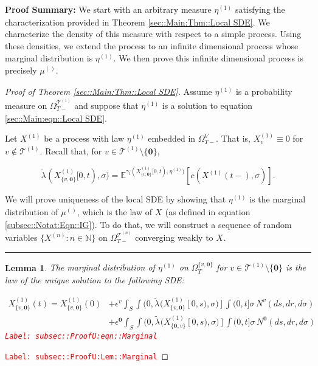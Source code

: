 \documentclass[12pt]{article}
\newcommand{\mb}{\mathbb}
\newcommand{\mc}{\mathcal}
\newcommand{\ov}{\overline}
\newcommand{\ep}{\epsilon}
\newcommand{\tr}{\textcolor{red}}
\newcommand{\labe}[1]{\tr{\texttt{Label: #1}}}
\newcommand{\pfsum}{\textbf{Proof Summary: }}
\newcommand{\ind}{\hspace{24pt}}
\newcommand{\lin}{\rule{\linewidth}{0.4 pt}}
\newcommand{\exmu}[2]{\mb{E}^{#1}\left[#2\right]}	%
\renewcommand{\root}{\mathbf{0}}				%
\renewcommand{\v}{v}							%
\renewcommand{\S}{S}							%
\newcommand{\s}{\sigma}							%
\newcommand{\ev}{\ep}							%
\newcommand{\T}{T}								%
\renewcommand{\t}{t}							%
\newcommand{\sset}{\Omega}						%
\renewcommand{\tt}{s}							%
\newcommand{\X}{X}								%
\newcommand{\vind}[1]{^{#1}}					%
\newcommand{\vsi}[1]{^{#1}}						%
\newcommand{\cind}[1]{_{#1}}					%
\newcommand{\tp}[1]{(#1)}						%
\newcommand{\tip}[1]{#1}						%
\newcommand{\ts}[1]{_{#1}}						%
\newcommand{\IGrg}{\ov{c}}						%
\newcommand{\tree}{\mc{T}}						%
\newcommand{\sln}[1]{^{(#1)}}					%
\newcommand{\poiss}{N}							%
\renewcommand{\r}{r}							%
\newcommand{\alt}[1]{\widetilde{#1}}			%
\newcommand{\m}{\mu}							%
\newcommand{\mmm}{\eta}							%
\newcommand{\cm}{\gamma}						%
\newcommand{\crate}{\alt{\lambda}}				%
\newtheorem{lem}[thms]{Lemma}
\begin{document}
\pfsum We start with an arbitrary measure \(\mmm\sln{1}\ts{}\) satisfying the characterization provided in Theorem \ref{sec::Main:Thm::Local SDE}. We characterize the density of this measure with respect to a simple process. Using these densities, we extend the process to an infinite dimensional process whose marginal distribution is \(\mmm\sln{1}\ts{}\). We then prove this infinite dimensional process is precisely \(\m\sln{}\ts{}\).

\begin{proof}[Proof of Theorem \ref{sec::Main:Thm::Local SDE}]

Assume \(\mmm\sln{1}\ts{}\) is a probability measure on \(\sset\vsi{\tree\sln{1}}\ts{\T-}\) and suppose that \(\mmm\sln{1}\ts{}\) is a solution to equation \eqref{sec::Main:eqn::Local SDE}.

\ind Let \(\X\sln{1}\cind{}\tip{}\) be a process with law \(\mmm\sln{1}\ts{}\) embedded in \(\sset\vsi{V}\ts{\T-}\). That is, \(\X\sln{1}\cind{\v}\tip{} \equiv 0\) for \(\v \notin \tree\sln{1}\). Recall that, for \(\v \in \tree\sln{1}\setminus\{\root\}\),

\[\crate\vind{}\ts{}(\X\sln{1}\cind{\{\v,\root\}}\tip{[0,\t)},\s) = \exmu{\cm\ts{\t}(\X\sln{1}\cind{\{\v,\root\}}\tip{[0,\t)},\mmm\sln{1}\ts{})}{\IGrg{}(\X\sln{1}\cind{}\tp{\t-},\s)}.\]

\ind We will prove uniqueness of the local SDE by showing that \(\mmm\sln{1}\ts{}\) is the marginal distribution of \(\m\sln{}\ts{}\), which is the law of \(\X\cind{}\tip{}\) (as defined in equation \eqref{subsec::Notat:Eqn::IG}). To do that, we will construct a sequence of random variables \(\{\X\sln{n}\cind{}\tip{}:n\in\mb{N}\}\) on \(\sset\vsi{\tree\sln{n}}\ts{\T-}\) converging weakly to \(\X\cind{}\tip{}\). 

\lin

\begin{lem}
The marginal distribution of \(\mmm\sln{1}\ts{}\) on \(\sset\vsi{\{\v,\root\}}\ts{\T}\) for \(\v \in \tree\sln{1}\setminus\{\root\}\) is the law of the unique solution to the following SDE:

\begin{align}
\X\sln{1}\cind{\{\v,\root\}}\tp{\t} = \X\sln{1}\cind{\{\v,\root\}}\tp{0} &+ \ev\vind{\v}\int_\S\int{(0,\crate\vind{}\ts{}(\X\sln{1}\cind{\{\v,\root\}}\tip{[0,\tt)},\s)]}\int{(0,\t]}\s\,\poiss\vind{\v}(d\tt,d\r,d\s)\nonumber\\
&+ \ev\vind{\root}\int_\S\int{(0,\crate\vind{}\ts{}(\X\sln{1}\cind{\{\root,\v\}}\tip{[0,\tt)},\s)]}\int{(0,\t]}\s\,\poiss\vind{\root}(d\tt,d\r,d\s)
\label{subsec::ProofU:eqn::Marginal}
\end{align}
\labe{subsec::ProofU:eqn::Marginal}
\label{subsec::ProofU:Lem::Marginal}
\end{lem}
\labe{subsec::ProofU:Lem::Marginal}


\end{proof}
\end{document}
